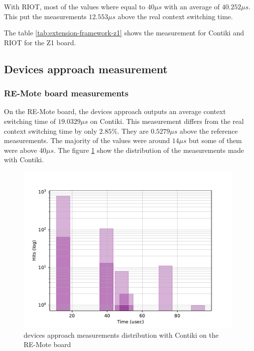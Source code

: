 With RIOT, most of the values where equal to $40 \mu s$ with an average of $40.252\mu s$.
This put the measurements $12.553\mu s$ above the real context switching time.

The table \ref{tab:extension-framework-z1} shows the measurement for Contiki and RIOT for the Z1 board.



\subsection{Devices approach measurement}

\subsubsection{RE-Mote board measurements}
On the RE-Mote board, the devices approach outputs an average context switching time of $19.0329\mu s$ on Contiki.
This measurement differs from the real context switching time by only $2.85\%$.
They are $0.5279\mu s$ above the reference measurements.
The majority of the values were around $14\mu s$ but some of them were above $40\mu s$.
The figure \ref{fig:devices-framework-contiki-remote} show the distribution of the measurements made with Contiki.

\begin{figure}[!ht]
      \centering
      \includegraphics[scale=.7]{assets/devices-framework-contiki-remote.pdf}
      \caption{devices approach measurements distribution with Contiki on the RE-Mote board\label{fig:devices-framework-contiki-remote}}
\end{figure}

